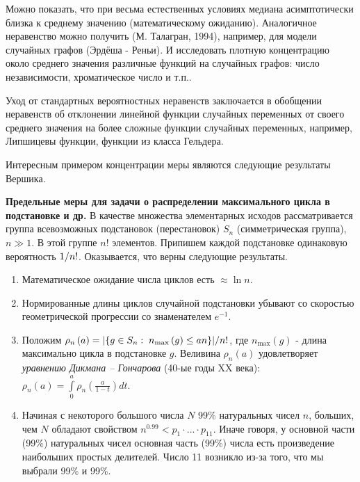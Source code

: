 Можно показать, что при весьма естественных условиях медиана асимптотически 
близка к среднему значению (математическому ожиданию). Аналогичное 
неравенство можно получить (М. Талагран, 1994), например, для модели 
случайных графов (Эрдёша - Реньи). И исследовать плотную концентрацию около 
среднего значения различные функций на случайных графов: число 
независимости, хроматическое число и т.п..

\medskip

Уход от стандартных вероятностных неравенств заключается в обобщении неравенств об  отклонении линейной функции  случайных переменных от своего среднего значения  на более сложные функции случайных переменных, например, Липшицевы функции, функции из класса Гельдера.
\medskip

Интересным примером концентрации меры являются следующие результаты Вершика. 

\textbf{Предельные меры для задачи о распределении максимального цикла в подстановке и др.}
В качестве множества элементарных исходов рассматривается группа всевозможных 
подстановок (перестановок) $S_n $ (симметрическая группа), $n\gg 1$. В этой 
группе $n!$ элементов. Припишем каждой подстановке одинаковую вероятность $1 
\mathord{\left/ {\vphantom {1 {n!}}} \right. \kern-\nulldelimiterspace} 
{n!}$. Оказывается, что верны следующие результаты.
\begin{enumerate}
\item  Математическое ожидание числа циклов есть 
$\approx \ln n$.

\item  Нормированные длины циклов случайной 
подстановки убывают со скоростью геометрической прогрессии со знаменателем 
$e^{-1}$.

\item Положим $\rho _n \left( a \right)={\left| {\left\{ {g\in S_n 
:\;n_{\max } \left( g \right)\le an} \right\}} \right|} \mathord{\left/ 
{\vphantom {{\left| {\left\{ {g\in S_n :\;n_{\max } \left( g \right)\le an} 
\right\}} \right|} {n!}}} \right. \kern-\nulldelimiterspace} {n!}$, где 
$n_{\max } \left( g \right)$ - длина максимально цикла в подстановке $g$. 
Веливина $\rho _n \left( a \right)$ удовлетворяет \textit{уравнению Дикмана -- Гончарова} (40-ые годы XX 
века):
$
\rho _n \left( a \right)=\int\limits_0^a {\rho _n \left( {\frac{a}{1-t}} 
\right)dt} .
$
\item  Начиная с некоторого большого числа $N$ 99{\%} 
натуральных чисел $n$, больших, чем $N$ обладают свойством
$
n^{0.99}<p_1 \cdot ...\cdot p_{11} .
$
Иначе говоря, у основной части (99{\%}) натуральных чисел основная часть 
(99{\%}) числа есть произведение наибольших простых делителей. Число 11 
возникло из-за того, что мы выбрали 99{\%} и 99{\%}.
\end{enumerate}

